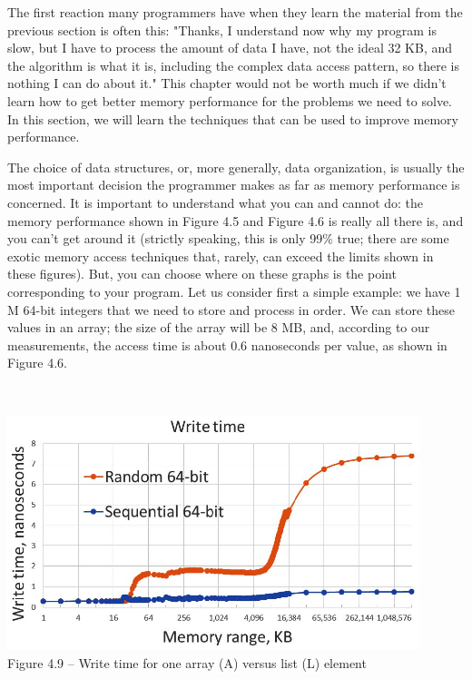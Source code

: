 
The first reaction many programmers have when they learn the material from the previous section is often this: "Thanks, I understand now why my program is slow, but I have to process the amount of data I have, not the ideal 32 KB, and the algorithm is what it is, including the complex data access pattern, so there is nothing I can do about it." This chapter would not be worth much if we didn't learn how to get better memory performance for the problems we need to solve. In this section, we will learn the techniques that can be used to improve memory performance.


The choice of data structures, or, more generally, data organization, is usually the most important decision the programmer makes as far as memory performance is concerned. It is important to understand what you can and cannot do: the memory performance shown in Figure 4.5 and Figure 4.6 is really all there is, and you can't get around it (strictly speaking, this is only 99\% true; there are some exotic memory access techniques that, rarely, can exceed the limits shown in these figures). But, you can choose where on these graphs is the point corresponding to your program. Let us consider first a simple example: we have 1 M 64-bit integers that we need to store and process in order. We can store these values in an array; the size of the array will be 8 MB, and, according to our measurements, the access time is about 0.6 nanoseconds per value, as shown in Figure 4.6.

\hspace*{\fill} \\ %
\begin{center}
\includegraphics[width=0.9\textwidth]{content/1/chapter4/images/9.jpg}\\
Figure 4.9 – Write time for one array (A) versus list (L) element
\end{center}

